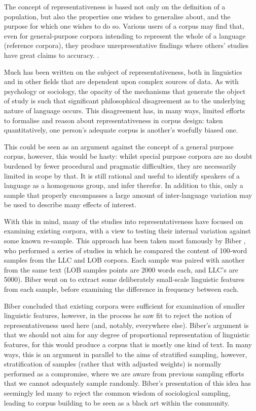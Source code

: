 The concept of representativeness is based not only on the definition of a population, but also the properties one wishes to generalise about, and the purpose for which one wishes to do so.  Various users of a corpus may find that, even for general-purpose corpora intending to represent the whole of a language (reference corpora), they produce unrepresentative findings where others' studies have great claims to accuracy. .

Much has been written on the subject of representativeness, both in linguistics and in other fields that are dependent upon complex sources of data.  As with psychology or sociology, the opacity of the mechanisms that generate the object of study is such that significant philosophical disagreement as to the underlying nature of language occurs.  This disagreement has, in many ways, limited efforts to formalise and reason about representativeness in corpus design: taken quantitatively, one person's adequate corpus is another's woefully biased one.

This could be seen as an argument against the concept of a general purpose corpus, however, this would be hasty: whilst special purpose corpora are no doubt burdened by fewer procedural and pragmatic difficulties, they are necessarily limited in scope by that.  It is still rational and useful to identify speakers of a language as a homogenous group, and infer therefor.  In addition to this, only a sample that properly encompasses a large amount of inter-language variation may be used to describe many effects of interest.

With this in mind, many of the studies into representativeness have focused on examining existing corpora, with a view to testing their internal variation against some known re-sample.  This approach has been taken most famously by Biber %
, who performed a series of studies in which he compared the content of 100-word samples from the LLC and LOB corpora.  Each sample was paired with another from the same text (LOB samples points are 2000 words each, and LLC's are 5000).  Biber went on to extract some deliberately small-scale linguistic features from each sample, before examining the difference in frequency between each.

Biber concluded that existing corpora were sufficient for examination of smaller linguistic features, however, in the process he saw fit to reject the notion of representativeness used here (and, notably, everywhere else).  Biber's argument is that we should not aim for any degree of proportional representation of linguistic features, for this would produce a corpus that is mostly one kind of text.  In many ways, this is an argument in parallel to the aims of stratified sampling, however, stratification of samples (rather that with adjusted weights) is normally performed as a compromise, where we are aware from previous sampling efforts that we cannot adequately sample randomly.  Biber's presentation of this idea has seemingly led many to reject the common wisdom of sociological sampling, leading to corpus building to be seen as a black art within the community.

